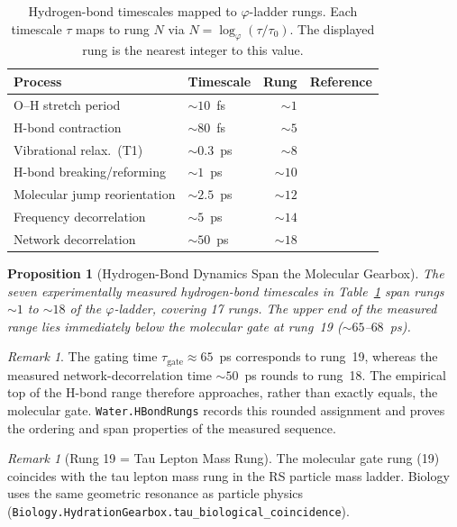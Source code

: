 \documentclass[12pt,a4paper]{article}
\newtheorem{proposition}[theorem]{Proposition}
\theoremstyle{definition}
\theoremstyle{remark}
\newtheorem{remark}[theorem]{Remark}
\begin{document}
\begin{table}[ht]
\centering
\caption{Hydrogen-bond timescales mapped to $\varphi$-ladder rungs.
Each timescale $\tau$ maps to rung $N$ via
$N = \log_\varphi(\tau/\tau_0)$.  The displayed rung is the nearest
integer to this value.}
\label{tab:hbond_rungs}
\small
\begin{tabular}{@{}llrl@{}}
\toprule
Process & Timescale & Rung & Reference \\
\midrule
O--H stretch period & $\sim 10$~fs & $\sim 1$ & \cite{Yang2025} \\
H-bond contraction & $\sim 80$~fs & $\sim 5$ & \cite{Nihonyanagi2021} \\
Vibrational relax.\ (T1) & $\sim 0.3$~ps & $\sim 8$ & \cite{Gaynor2024} \\
H-bond breaking/reforming & $\sim 1$~ps & $\sim 10$ & \cite{Laage2006} \\
Molecular jump reorientation & $\sim 2.5$~ps & $\sim 12$ & \cite{Laage2006} \\
Frequency decorrelation & $\sim 5$~ps & $\sim 14$ & \cite{Gaynor2024} \\
Network decorrelation & $\sim 50$~ps & $\sim 18$ & \cite{Laage2006} \\
\bottomrule
\end{tabular}
\end{table}

\begin{proposition}[Hydrogen-Bond Dynamics Span the Molecular Gearbox]
\label{prop:hbond_span}
The seven experimentally measured hydrogen-bond timescales in
Table~\ref{tab:hbond_rungs} span rungs $\sim 1$ to $\sim 18$ of the
$\varphi$-ladder, covering 17 rungs.  The upper end of the measured
range lies immediately below the molecular gate at rung~19
($\sim 65$--$68$~ps).
\end{proposition}

\begin{remark}
The gating time $\tau_{\mathrm{gate}} \approx 65$~ps corresponds to
rung~19, whereas the measured network-decorrelation time
$\sim 50$~ps rounds to rung~18.  The empirical top of the H-bond range
therefore approaches, rather than exactly equals, the molecular gate.
\texttt{Water.HBondRungs} records this rounded assignment and proves the
ordering and span properties of the measured sequence.
\end{remark}

\begin{remark}[Rung 19 = Tau Lepton Mass Rung]
The molecular gate rung (19) coincides with the tau lepton mass rung in
the RS particle mass ladder.  Biology uses the same geometric resonance
as particle physics
(\texttt{Biology.HydrationGearbox.tau\_biological\_coincidence}).
\end{remark}
\end{document}
